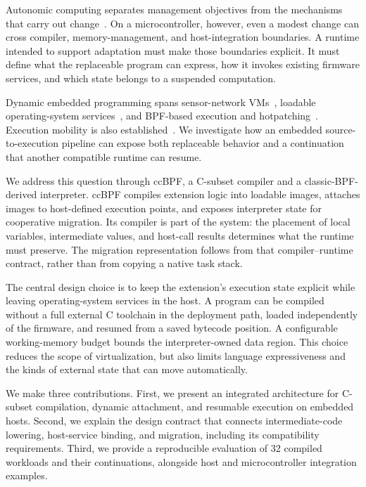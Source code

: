 \documentclass[conference,letterpaper]{IEEEtran}
\begin{document}
Autonomic computing separates management objectives from the mechanisms that carry out change~\cite{autonomic}. On a microcontroller, however, even a modest change can cross compiler, memory-management, and host-integration boundaries. A runtime intended to support adaptation must make those boundaries explicit. It must define what the replaceable program can express, how it invokes existing firmware services, and which state belongs to a suspended computation.

Dynamic embedded programming spans sensor-network VMs~\cite{mate}, loadable operating-system services~\cite{contiki}, and BPF-based execution and hotpatching~\cite{rbpf,femto,rapid}. Execution mobility is also established~\cite{mobility,agilla}. We investigate how an embedded source-to-execution pipeline can expose both replaceable behavior and a continuation that another compatible runtime can resume.

We address this question through ccBPF, a C-subset compiler and a classic-BPF-derived interpreter. ccBPF compiles extension logic into loadable images, attaches images to host-defined execution points, and exposes interpreter state for cooperative migration. Its compiler is part of the system: the placement of local variables, intermediate values, and host-call results determines what the runtime must preserve. The migration representation follows from that compiler--runtime contract, rather than from copying a native task stack.

The central design choice is to keep the extension's execution state explicit while leaving operating-system services in the host. A program can be compiled without a full external C toolchain in the deployment path, loaded independently of the firmware, and resumed from a saved bytecode position. A configurable working-memory budget bounds the interpreter-owned data region. This choice reduces the scope of virtualization, but also limits language expressiveness and the kinds of external state that can move automatically.

We make three contributions. First, we present an integrated architecture for C-subset compilation, dynamic attachment, and resumable execution on embedded hosts. Second, we explain the design contract that connects intermediate-code lowering, host-service binding, and migration, including its compatibility requirements. Third, we provide a reproducible evaluation of 32 compiled workloads and their continuations, alongside host and microcontroller integration examples.
\end{document}
